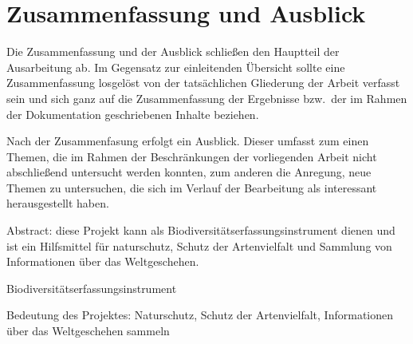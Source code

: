 \section{Zusammenfassung und Ausblick%
         \label{sec:zusammen}}

Die Zusammenfassung und der Ausblick schließen den Hauptteil der Ausarbeitung ab. 
Im Gegensatz zur einleitenden Übersicht sollte eine Zusammenfassung losgelöst
von der tatsächlichen Gliederung der Arbeit verfasst sein und sich ganz auf die
Zusammenfassung der Ergebnisse bzw.\ der im Rahmen der Dokumentation
geschriebenen Inhalte beziehen. 

Nach der Zusammenfasung erfolgt ein Ausblick. 
Dieser umfasst zum einen Themen, die im Rahmen der Beschränkungen der
vorliegenden Arbeit nicht abschließend untersucht werden konnten,
zum anderen die Anregung, neue Themen zu untersuchen, die sich im Verlauf der
Bearbeitung als interessant herausgestellt haben. 




Abstract: diese Projekt kann als Biodiversitätserfassungsinstrument dienen und ist ein Hilfsmittel für naturschutz, Schutz der Artenvielfalt und Sammlung von Informationen über das Weltgeschehen.  



Biodiversitätserfassungsinstrument

Bedeutung des Projektes: Naturschutz, Schutz der Artenvielfalt, Informationen über das Weltgeschehen sammeln
